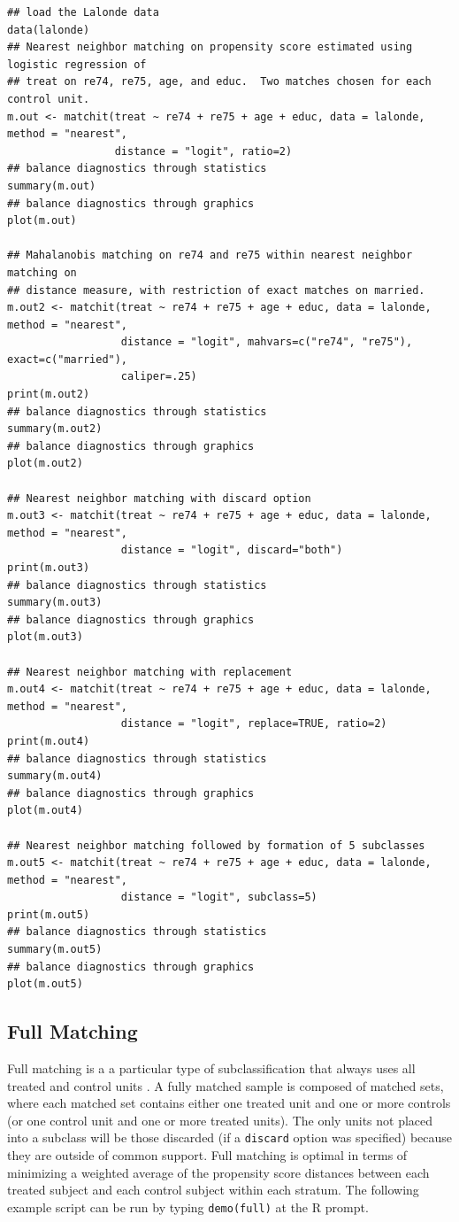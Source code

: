 \documentclass[oneside,letterpaper,titlepage]{article}
\begin{document}
\begin{verbatim}
## load the Lalonde data
data(lalonde)
## Nearest neighbor matching on propensity score estimated using logistic regression of
## treat on re74, re75, age, and educ.  Two matches chosen for each control unit.
m.out <- matchit(treat ~ re74 + re75 + age + educ, data = lalonde, method = "nearest", 
                 distance = "logit", ratio=2)
## balance diagnostics through statistics
summary(m.out)
## balance diagnostics through graphics
plot(m.out)

## Mahalanobis matching on re74 and re75 within nearest neighbor matching on 
## distance measure, with restriction of exact matches on married.
m.out2 <- matchit(treat ~ re74 + re75 + age + educ, data = lalonde, method = "nearest", 
                  distance = "logit", mahvars=c("re74", "re75"), exact=c("married"), 
                  caliper=.25)
print(m.out2)
## balance diagnostics through statistics
summary(m.out2)
## balance diagnostics through graphics
plot(m.out2)

## Nearest neighbor matching with discard option
m.out3 <- matchit(treat ~ re74 + re75 + age + educ, data = lalonde, method = "nearest", 
                  distance = "logit", discard="both")
print(m.out3)
## balance diagnostics through statistics
summary(m.out3)
## balance diagnostics through graphics
plot(m.out3)

## Nearest neighbor matching with replacement
m.out4 <- matchit(treat ~ re74 + re75 + age + educ, data = lalonde, method = "nearest", 
                  distance = "logit", replace=TRUE, ratio=2)
print(m.out4)
## balance diagnostics through statistics
summary(m.out4)
## balance diagnostics through graphics
plot(m.out4)

## Nearest neighbor matching followed by formation of 5 subclasses
m.out5 <- matchit(treat ~ re74 + re75 + age + educ, data = lalonde, method = "nearest", 
                  distance = "logit", subclass=5)
print(m.out5)
## balance diagnostics through statistics
summary(m.out5)
## balance diagnostics through graphics
plot(m.out5)
\end{verbatim}

\subsection{Full Matching}
\label{fullmatching}

Full matching is a a particular type of subclassification that always
uses all treated and control units \citep{Rosenbaum02, Hansen04}.  A
fully matched sample is composed of matched sets, where each matched
set contains either one treated unit and one or more controls (or one
control unit and one or more treated units).  The only units not
placed into a subclass will be those discarded (if a \texttt{discard}
option was specified) because they are outside of common support.
Full matching is optimal in terms of minimizing a weighted average of
the propensity score distances between each treated subject and each
control subject within each stratum.  The following example script can
be run by typing {\tt demo(full)} at the R prompt.
\end{document}
